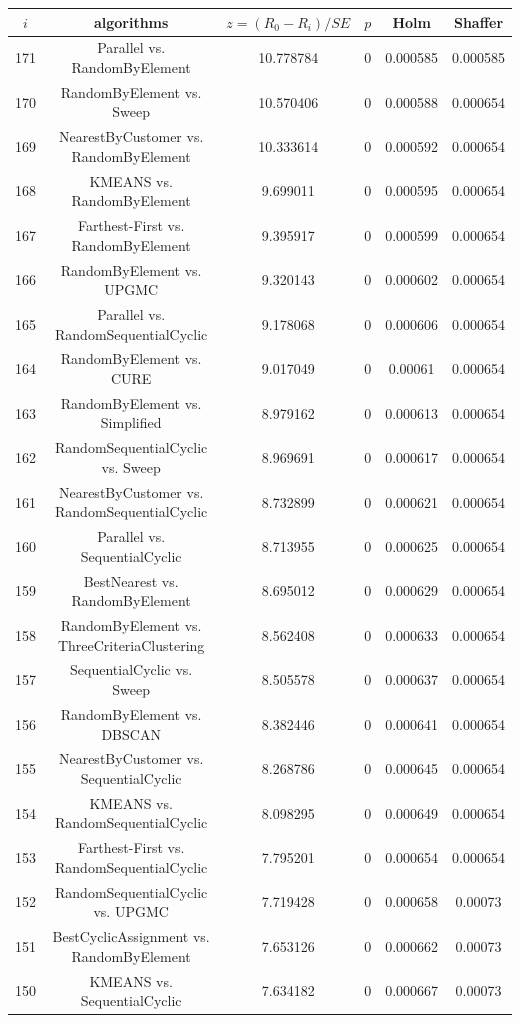 \documentclass[a4paper,10pt]{article}
\begin{document}
\begin{landscape}
\begin{table}[!htp]
\centering\scriptsize
\begin{tabular}{cccccc}
$i$&algorithms&$z=(R_0 - R_i)/SE$&$p$&Holm&Shaffer\\
\hline171&Parallel vs. RandomByElement&10.778784&0&0.000585&0.000585\\
170&RandomByElement vs. Sweep&10.570406&0&0.000588&0.000654\\
169&NearestByCustomer vs. RandomByElement&10.333614&0&0.000592&0.000654\\
168&KMEANS vs. RandomByElement&9.699011&0&0.000595&0.000654\\
167&Farthest-First vs. RandomByElement&9.395917&0&0.000599&0.000654\\
166&RandomByElement vs. UPGMC&9.320143&0&0.000602&0.000654\\
165&Parallel vs. RandomSequentialCyclic&9.178068&0&0.000606&0.000654\\
164&RandomByElement vs. CURE&9.017049&0&0.00061&0.000654\\
163&RandomByElement vs. Simplified&8.979162&0&0.000613&0.000654\\
162&RandomSequentialCyclic vs. Sweep&8.969691&0&0.000617&0.000654\\
161&NearestByCustomer vs. RandomSequentialCyclic&8.732899&0&0.000621&0.000654\\
160&Parallel vs. SequentialCyclic&8.713955&0&0.000625&0.000654\\
159&BestNearest vs. RandomByElement&8.695012&0&0.000629&0.000654\\
158&RandomByElement vs. ThreeCriteriaClustering&8.562408&0&0.000633&0.000654\\
157&SequentialCyclic vs. Sweep&8.505578&0&0.000637&0.000654\\
156&RandomByElement vs. DBSCAN&8.382446&0&0.000641&0.000654\\
155&NearestByCustomer vs. SequentialCyclic&8.268786&0&0.000645&0.000654\\
154&KMEANS vs. RandomSequentialCyclic&8.098295&0&0.000649&0.000654\\
153&Farthest-First vs. RandomSequentialCyclic&7.795201&0&0.000654&0.000654\\
152&RandomSequentialCyclic vs. UPGMC&7.719428&0&0.000658&0.00073\\
151&BestCyclicAssignment vs. RandomByElement&7.653126&0&0.000662&0.00073\\
150&KMEANS vs. SequentialCyclic&7.634182&0&0.000667&0.00073\\

\end{tabular}
\end{table}
\end{landscape}
\end{document}
